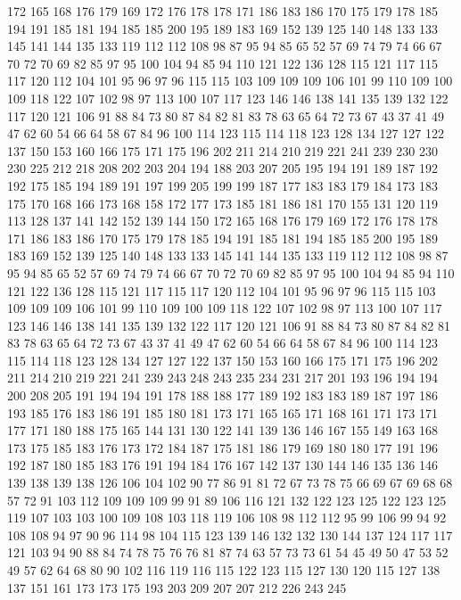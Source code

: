172 165 168 176 179 169 172 176 178 178 171 186 183 186 170 175 179 178 185 194
191 185 181 194 185 185 200 195 189 183 169 152 139 125 140 148 133 133 145 141
144 135 133 119 112 112 108 98 87 95 94 85 65 52 57 69 74 79 74 66
67 70 72 70 69 82 85 97 95 100 104 94 85 94 110 121 122 136 128 115
121 117 115 117 120 112 104 101 95 96 97 96 115 115 103 109 109 109 106 101
99 110 109 100 109 118 122 107 102 98 97 113 100 107 117 123 146 146 138 141
135 139 132 122 117 120 121 106 91 88 84 73 80 87 84 82 81 83 78 63
65 64 72 73 67 43 37 41 49 47 62 60 54 66 64 58 67 84 96 100
114 123 115 114 118 123 128 134 127 127 122 137 150 153 160 166 175 171 175 196
202 211 214 210 219 221 241 239 230 230 230 225 212 218 208 202 203 204 194 188
203 207 205 195 194 191 189 187 192 192 175 185 194 189 191 197 199 205 199 199
187 177 183 183 179 184 173 183 175 170 168 166 173 168 158 172 177 173 185 181
186 181 170 155 131 120 119 113 128 137 141 142 152 139 144 150 172 165 168 176
179 169 172 176 178 178 171 186 183 186 170 175 179 178 185 194 191 185 181 194
185 185 200 195 189 183 169 152 139 125 140 148 133 133 145 141 144 135 133 119
112 112 108 98 87 95 94 85 65 52 57 69 74 79 74 66 67 70 72 70
69 82 85 97 95 100 104 94 85 94 110 121 122 136 128 115 121 117 115 117
120 112 104 101 95 96 97 96 115 115 103 109 109 109 106 101 99 110 109 100
109 118 122 107 102 98 97 113 100 107 117 123 146 146 138 141 135 139 132 122
117 120 121 106 91 88 84 73 80 87 84 82 81 83 78 63 65 64 72 73
67 43 37 41 49 47 62 60 54 66 64 58 67 84 96 100 114 123 115 114
118 123 128 134 127 127 122 137 150 153 160 166 175 171 175 196 202 211 214 210
219 221 241 239 243 248 243 235 234 231 217 201 193 196 194 194 200 208 205 191
194 194 191 178 188 188 177 189 192 183 183 189 187 197 186 193 185 176 183 186
191 185 180 181 173 171 165 165 171 168 161 171 173 171 177 171 180 188 175 165
144 131 130 122 141 139 136 146 167 155 149 163 168 173 175 185 183 176 173 172
184 187 175 181 186 179 169 180 180 177 191 196 192 187 180 185 183 176 191 194
184 176 167 142 137 130 144 146 135 136 146 139 138 139 138 126 106 104 102 90
77 86 91 81 72 67 73 78 75 66 69 67 69 68 68 57 72 91 103 112
109 109 109 99 91 89 106 116 121 132 122 123 125 122 123 125 119 107 103 103
100 109 108 103 118 119 106 108 98 112 112 95 99 106 99 94 92 108 108 94
97 90 96 114 98 104 115 123 139 146 132 132 130 144 137 124 117 117 121 103
94 90 88 84 74 78 75 76 76 81 87 74 63 57 73 73 61 54 45 49
50 47 53 52 49 57 62 64 68 80 90 102 116 119 116 115 122 123 115 127
130 120 115 127 138 137 151 161 173 173 175 193 203 209 207 207 212 226 243 245
